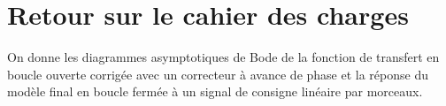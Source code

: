 \documentclass[10pt,fleqn]{article} %
\begin{document}
\begin{multicols}{2}
\begin{center}
\end{center}
%
%
%

\section*{Retour sur le cahier des charges}



On donne %
les diagrammes asymptotiques de Bode de la fonction de transfert en boucle ouverte corrigée avec un correcteur à avance de phase et la réponse du modèle final en boucle fermée à un signal de consigne linéaire par morceaux.




%
%
%
%
% 






\end{multicols}
\end{document}
